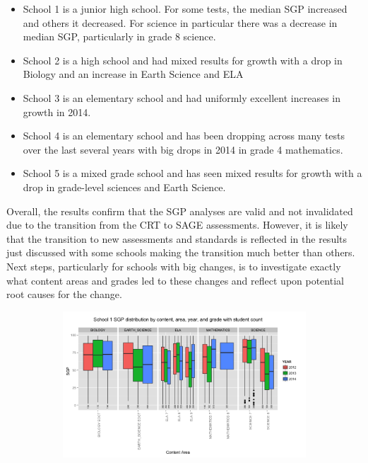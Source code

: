 \documentclass[12pt]{article}
\begin{document}
\begin{itemize}
\itemsep1pt\parskip0pt
\item
  School 1 is a junior high school. For some tests, the median SGP
  increased and others it decreased. For science in particular there was
  a decrease in median SGP, particularly in grade 8 science.
\item
  School 2 is a high school and had mixed results for growth with a drop
  in Biology and an increase in Earth Science and ELA
\item
  School 3 is an elementary school and had uniformly excellent increases
  in growth in 2014.
\item
  School 4 is an elementary school and has been dropping across many
  tests over the last several years with big drops in 2014 in grade 4
  mathematics.
\item
  School 5 is a mixed grade school and has seen mixed results for growth
  with a drop in grade-level sciences and Earth Science.
\end{itemize}

Overall, the results confirm that the SGP analyses are valid and not
invalidated due to the transition from the CRT to SAGE assessments.
However, it is likely that the transition to new assessments and
standards is reflected in the results just discussed with some schools
making the transition much better than others. Next steps, particularly
for schools with big changes, is to investigate exactly what content
areas and grades led to these changes and reflect upon potential root
causes for the change.

\begin{figure}[H]
\caption*{\label{fig:Bidensity} {\bf{Fig. C.5:}} School SGP distribution by content area, year, and grade with student count.}
  \begin{subfigure}[b]{\textwidth}
    \includegraphics[width=\textwidth]{../img/Appendices/Appendix_C/School_MSGP_Dist_Boxplot-1.png}
  \end{subfigure}
\end{figure}
\end{document}
